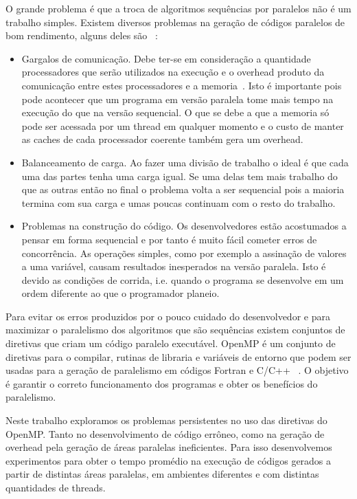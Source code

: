 \documentclass[a4paper,12pt,fleqn]{article}
\begin{document}
O grande problema é que a troca de algoritmos sequências por paralelos não é um trabalho simples. Existem diversos problemas na geração de códigos paralelos de bom rendimento, alguns deles são ~\cite{Matloff14}: 
\begin{itemize} 
\item Gargalos de comunicação. Debe ter-se em consideração a quantidade processadores que serão utilizados na execução e o overhead produto da comunicação entre estes processadores e a memoria~\cite{Gebali11}. Isto é importante pois pode acontecer que um programa em versão paralela tome mais tempo na execução do que na versão sequencial. O que se debe a que a memoria só pode ser acessada por um thread em qualquer momento e o custo de manter as caches de cada processador coerente também gera um overhead. 
\item Balanceamento de carga. Ao fazer uma divisão de trabalho o ideal é que cada uma das partes tenha uma carga igual. Se uma delas tem mais trabalho do que as outras então no final o problema volta a ser sequencial pois a maioria termina com sua carga e umas poucas continuam com o resto do trabalho. 
\item Problemas na construção do código. Os desenvolvedores estão acostumados a pensar em forma sequencial e por tanto é muito fácil cometer erros de 
concorrência. As operações simples, como por exemplo a assinação de valores a uma variável, causam resultados inesperados na versão paralela. Isto é devido as condições de corrida, i.e. quando o programa se desenvolve em um ordem diferente ao que o programador planeio. 
\end{itemize} 
 Para evitar os erros produzidos por o pouco cuidado do desenvolvedor e para maximizar o paralelismo dos algoritmos que são sequências existem conjuntos de diretivas que criam um código paralelo executável. OpenMP é um conjunto de diretivas para o compilar, rutinas de libraria e variáveis de entorno que podem ser usadas para a geração de paralelismo em códigos Fortran e C/C++ ~\cite{OpenMP13}. O objetivo é garantir o correto funcionamento dos programas e obter os benefícios do paralelismo. 
 
Neste trabalho exploramos os problemas persistentes no uso das diretivas do OpenMP. Tanto no desenvolvimento de código errôneo, como na geração de overhead pela geração de áreas paralelas ineficientes. Para isso desenvolvemos experimentos para obter o tempo promédio na execução de códigos gerados a partir de distintas áreas paralelas, em ambientes diferentes e com distintas quantidades de threads. 
 
\end{document}
